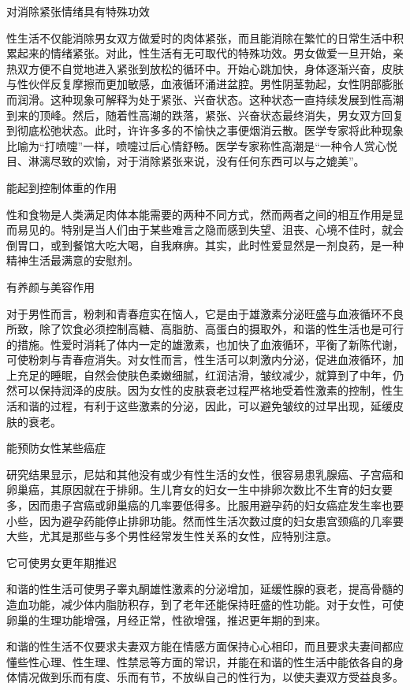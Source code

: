 \documentclass[12pt,UTF8,openany]{ctexbook}
\begin{document}
对消除紧张情绪具有特殊功效

性生活不仅能消除男女双方做爱时的肉体紧张，而且能消除在繁忙的日常生活中积累起来的情绪紧张。对此，性生活有无可取代的特殊功效。男女做爱一旦开始，亲热双方便不自觉地进入紧张到放松的循环中。开始心跳加快，身体逐渐兴奋，皮肤与性伙伴反复摩擦而更加敏感，血液循环涌进盆腔。男性阴茎勃起，女性阴部膨胀而润滑。这种现象可解释为处于紧张、兴奋状态。这种状态一直持续发展到性高潮到来的顶峰。然后，随着性高潮的跌落，紧张、兴奋状态最终消失，男女双方回复到彻底松弛状态。此时，许许多多的不愉快之事便烟消云散。医学专家将此种现象比喻为“打喷嚏”一样，喷嚏过后心情舒畅。医学专家称性高潮是“一种令人赏心悦目、淋漓尽致的欢愉，对于消除紧张来说，没有任何东西可以与之媲美”。

能起到控制体重的作用

性和食物是人类满足肉体本能需要的两种不同方式，然而两者之间的相互作用是显而易见的。特别是当人们由于某些难言之隐而感到失望、沮丧、心境不佳时，就会倒胃口，或到餐馆大吃大喝，自我麻痹。其实，此时性爱显然是一剂良药，是一种精神生活最满意的安慰剂。

有养颜与美容作用

对于男性而言，粉刺和青春痘实在恼人，它是由于雄激素分泌旺盛与血液循环不良所致，除了饮食必须控制高糖、高脂肪、高蛋白的摄取外，和谐的性生活也是可行的措施。性爱时消耗了体内一定的雄激素，也加快了血液循环，平衡了新陈代谢，可使粉刺与青春痘消失。对女性而言，性生活可以刺激内分泌，促进血液循环，加上充足的睡眠，自然会使肤色柔嫩细腻，红润洁滑，皱纹减少，就算到了中年，仍然可以保持润泽的皮肤。因为女性的皮肤衰老过程严格地受着性激素的控制，性生活和谐的过程，有利于这些激素的分泌，因此，可以避免皱纹的过早出现，延缓皮肤的衰老。

能预防女性某些癌症

研究结果显示，尼姑和其他没有或少有性生活的女性，很容易患乳腺癌、子宫癌和卵巢癌，其原因就在于排卵。生儿育女的妇女一生中排卵次数比不生育的妇女要多，因而患子宫癌或卵巢癌的几率要低得多。比服用避孕药的妇女癌症发生率也要小些，因为避孕药能停止排卵功能。然而性生活次数过度的妇女患宫颈癌的几率要大些，尤其是那些与多个男性经常发生性关系的女性，应特别注意。

它可使男女更年期推迟

和谐的性生活可使男子睾丸酮雄性激素的分泌增加，延缓性腺的衰老，提高骨髓的造血功能，减少体内脂肪积存，到了老年还能保持旺盛的性功能。对于女性，可使卵巢的生理功能增强，月经正常，性欲增强，推迟更年期的到来。

和谐的性生活不仅要求夫妻双方能在情感方面保持心心相印，而且要求夫妻间都应懂些性心理、性生理、性禁忌等方面的常识，并能在和谐的性生活中能依各自的身体情况做到乐而有度、乐而有节，不放纵自己的性行为，以使夫妻双方受益良多。
\end{document}
